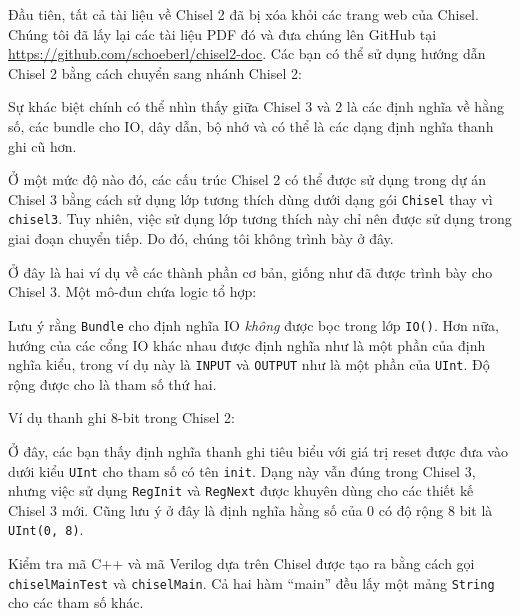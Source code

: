 \documentclass[%
    10pt,
    headinclude, footexclude,
    openright, %
    notitlepage,
    cleardoubleempty,
    headsepline,
    pointlessnumbers,
    bibtotoc, idxtotoc,
    ]{scrbook}
\newcommand{\code}[1]{{\small{\texttt{#1}}}}
\begin{document}
Đầu tiên, tất cả tài liệu về Chisel 2 đã bị xóa khỏi các trang web của Chisel. Chúng tôi đã lấy lại các tài liệu PDF đó và đưa chúng lên GitHub tại \url{https://github.com/schoeberl/chisel2-doc}. Các bạn có thể sử dụng hướng dẫn Chisel 2 bằng cách chuyển sang nhánh Chisel 2: 


Sự khác biệt chính có thể nhìn thấy giữa Chisel 3 và 2 là các định nghĩa về hằng số, các bundle cho IO, dây dẫn, bộ nhớ và có thể là các dạng định nghĩa thanh ghi cũ hơn.

Ở một mức độ nào đó, các cấu trúc Chisel 2 có thể được sử dụng trong dự án Chisel 3 bằng cách sử dụng lớp tương thích dùng dưới dạng gói \code{Chisel} thay vì \code{chisel3}. Tuy nhiên, việc sử dụng lớp tương thích này chỉ nên được sử dụng trong giai đoạn chuyển tiếp. Do đó, chúng tôi không trình bày ở đây.

Ở đây là hai ví dụ về các thành phần cơ bản, giống như đã được trình bày cho Chisel 3. Một mô-đun chứa logic tổ hợp: 


Lưu ý rằng \code{Bundle} cho định nghĩa IO \emph{không} được bọc trong lớp \code{IO()}. Hơn nữa, hướng của các cổng IO khác nhau được định nghĩa như là một phần của định nghĩa kiểu, trong ví dụ này là \code{INPUT} và \code{OUTPUT} như là một phần của \code{UInt}. Độ rộng được cho là tham số thứ hai. 

\begin{minipage}{\linewidth}
Ví dụ thanh ghi 8-bit trong Chisel 2:

\end{minipage}

Ở đây, các bạn thấy định nghĩa thanh ghi tiêu biểu với giá trị reset được đưa vào dưới kiểu \code{UInt} cho tham số có tên \code{init}. Dạng này vẫn đúng trong Chisel 3, nhưng việc sử dụng \code{RegInit} và \code{RegNext} được khuyên dùng cho các thiết kế Chisel 3 mới. Cũng lưu ý ở đây là định nghĩa hằng số của 0 có độ rộng 8 bit là \code{UInt(0, 8)}.

Kiểm tra mã C++ và mã Verilog dựa trên Chisel được tạo ra bằng cách gọi \code{chiselMainTest} và \code{chiselMain}. Cả hai hàm ``main'' đều lấy một mảng \code{String} cho các tham số khác. 
\end{document}
